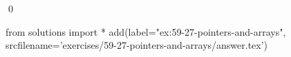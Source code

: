 
\begin{ex}
  \label{ex:59-27-pointers-and-arrays}
  
  \qed
\end{ex}
\begin{python0}
from solutions import *
add(label="ex:59-27-pointers-and-arrays",
    srcfilename='exercises/59-27-pointers-and-arrays/answer.tex')
\end{python0}
